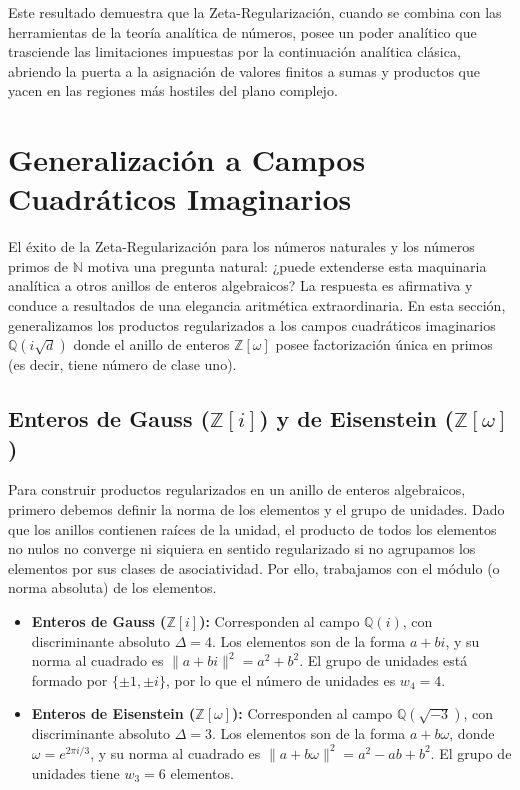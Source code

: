 Este resultado demuestra que la Zeta-Regularización, cuando se combina con las herramientas de la teoría analítica de números, posee un poder analítico que trasciende las limitaciones impuestas por la continuación analítica clásica, abriendo la puerta a la asignación de valores finitos a sumas y productos que yacen en las regiones más hostiles del plano complejo.

\section{Generalización a Campos Cuadráticos Imaginarios}

El éxito de la Zeta-Regularización para los números naturales y los números primos de $\mathbb{N}$ motiva una pregunta natural: ¿puede extenderse esta maquinaria analítica a otros anillos de enteros algebraicos? La respuesta es afirmativa y conduce a resultados de una elegancia aritmética extraordinaria. En esta sección, generalizamos los productos regularizados a los campos cuadráticos imaginarios $\mathbb{Q}(i\sqrt{d})$ donde el anillo de enteros $\mathbb{Z}[\omega]$ posee factorización única en primos (es decir, tiene número de clase uno). 

\subsection{Enteros de Gauss ($\mathbb{Z}[i]$) y de Eisenstein ($\mathbb{Z}[\omega]$)}

Para construir productos regularizados en un anillo de enteros algebraicos, primero debemos definir la norma de los elementos y el grupo de unidades. Dado que los anillos contienen raíces de la unidad, el producto de todos los elementos no nulos no converge ni siquiera en sentido regularizado si no agrupamos los elementos por sus clases de asociatividad. Por ello, trabajamos con el módulo (o norma absoluta) de los elementos.

\begin{itemize}
    \item \textbf{Enteros de Gauss ($\mathbb{Z}[i]$):} Corresponden al campo $\mathbb{Q}(i)$, con discriminante absoluto $\Delta = 4$. Los elementos son de la forma $a+bi$, y su norma al cuadrado es $\|a+bi\|^2 = a^2+b^2$. El grupo de unidades está formado por $\{\pm 1, \pm i\}$, por lo que el número de unidades es $w_4 = 4$.
    \item \textbf{Enteros de Eisenstein ($\mathbb{Z}[\omega]$):} Corresponden al campo $\mathbb{Q}(\sqrt{-3})$, con discriminante absoluto $\Delta = 3$. Los elementos son de la forma $a+b\omega$, donde $\omega = e^{2\pi i/3}$, y su norma al cuadrado es $\|a+b\omega\|^2 = a^2-ab+b^2$. El grupo de unidades tiene $w_3 = 6$ elementos.
\end{itemize}


